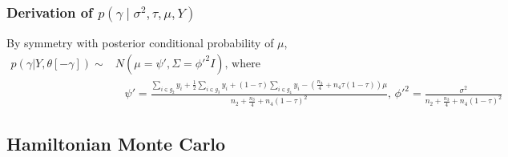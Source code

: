 \documentclass{article}
\begin{document}
\subsubsection{Derivation of $p(\gamma \mid \sigma^2, \tau, \mu, Y)$}
By symmetry with posterior conditional probability of $\mu$,
\begin{align*}
  p(\gamma | Y, \theta[-\gamma]) \sim& N(\mu = \psi', \Sigma = \phi'^2 I) \textrm{, where }\\
  &\;\;\; \psi' = \frac{\sum_{i \in g_2}y_i + \frac{1}{2}\sum_{i\in g_3}y_i + (1-\tau)\sum_{i\in g_4}y_i - (\frac{n_3}{4} + n_4\tau(1 - \tau))\mu}{n_2 + \frac{n_3}{4} + n_4(1-\tau)^2} \textrm{, } \phi'^2 = \frac{\sigma^2}{n_2 + \frac{n_3}{4} + n_4(1-\tau)^2}
\end{align*}


\subsection{Hamiltonian Monte Carlo}
\label{sec:a_hmc}
\end{document}
